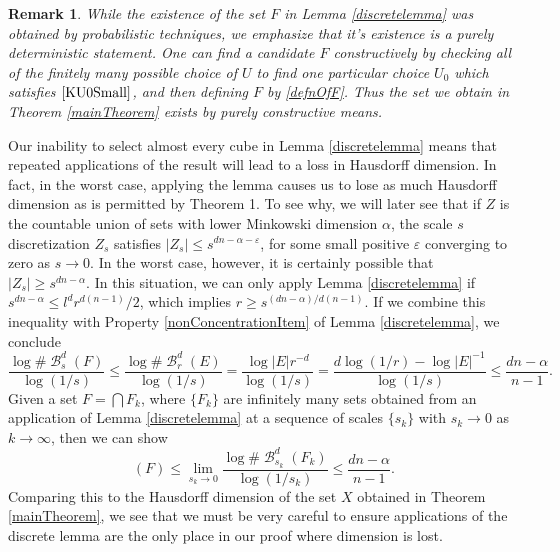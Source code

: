 \documentclass[dvipsnames,letterpaper,12pt]{article}
\numberwithin{equation}{section}
\theoremstyle{plain}
\newtheorem*{remark}{Remark}
\DeclareMathOperator{\hausdim}{\dim_{\mathbf{H}}}
\DeclareMathOperator{\B}{\mathcal{B}}
\begin{document}
\begin{remark}
	While the existence of the set $F$ in Lemma \ref{discretelemma} was obtained by probabilistic techniques, we emphasize that it's existence is a purely deterministic statement. One can find a candidate $F$ constructively by checking all of the finitely many possible choice of $U$ to find one particular choice $U_0$ which satisfies $\eqref{KU0Small}$, and then defining $F$ by \eqref{defnOfF}.
	Thus the set we obtain in Theorem \ref{mainTheorem} exists by purely constructive means.
\end{remark}

Our inability to select almost every cube in Lemma \ref{discretelemma} means that repeated applications of the result will lead to a loss in Hausdorff dimension. In fact, in the worst case, applying the lemma causes us to lose as much Hausdorff dimension as is permitted by Theorem 1. To see why, we will later see that if $Z$ is the countable union of sets with lower Minkowski dimension $\alpha$, the scale $s$ discretization $Z_s$ satisfies $|Z_s| \leq s^{dn - \alpha - \varepsilon}$, for some small positive $\varepsilon$ converging to zero as $s \to 0$. In the worst case, however, it is certainly possible that $|Z_s| \geq s^{dn - \alpha}$. In this situation, we can only apply Lemma \ref{discretelemma} if $s^{dn - \alpha} \leq l^d r^{d(n-1)}/2$, which implies $r \geq s^{(dn - \alpha)/d(n-1)}$. If we combine this inequality with Property \ref{nonConcentrationItem} of Lemma \ref{discretelemma}, we conclude
%
\[	\frac{\log \# \B^d_s(F)}{\log(1/s)} \leq \frac{\log \# \B^d_r(E)}{\log(1/s)} = \frac{\log |E| r^{-d}}{\log(1/s)} = \frac{d \log(1/r) - \log |E|^{-1}}{\log(1/s)} \leq \frac{dn - \alpha}{n - 1}. \]
%
Given a set $F = \bigcap F_k$, where $\{ F_k \}$ are infinitely many sets obtained from an application of Lemma \ref{discretelemma} at a sequence of scales $\{ s_k \}$ with $s_k \to 0$ as $k \to \infty$, then we can show%
%
\[	\hausdim(F) \leq \lim_{s_k \to 0} \frac{\log \# \B^d_{s_k}(F_k)}{\log(1/s_k)} \leq \frac{dn - \alpha}{n-1}. \]
%
Comparing this to the Hausdorff dimension of the set $X$ obtained in Theorem \ref{mainTheorem}, we see that we must be very careful to ensure applications of the discrete lemma are the only place in our proof where dimension is lost.
\end{document}
